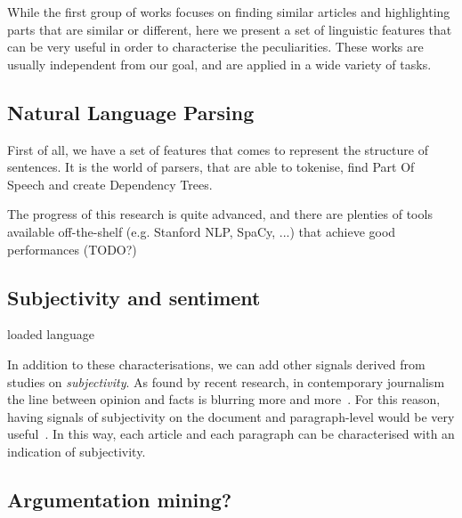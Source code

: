 While the first group of works focuses on finding similar articles and highlighting parts that are similar or different, here we present a set of linguistic features that can be very useful in order to characterise the peculiarities. These works are usually independent from our goal, and are applied in a wide variety of tasks.

\subsection{Natural Language Parsing}

First of all, we have a set of features that comes to represent the structure of sentences. It is the world of parsers, that are able to tokenise, find Part Of Speech and create Dependency Trees.

The progress of this research is quite advanced, and there are plenties of tools available off-the-shelf (e.g. Stanford NLP, SpaCy, ...) that achieve good performances (TODO?)



\subsection{Subjectivity and sentiment}

loaded language

In addition to these characterisations, we can add other signals derived from studies on \emph{subjectivity}.
As found by recent research, in contemporary journalism the line between opinion and facts is blurring more and more~\cite{blake2019news}. For this reason, having signals of subjectivity on the document and paragraph-level would be very useful~\cite{liu2010sentiment}.
In this way, each article and each paragraph can be characterised with an indication of subjectivity.

\subsection{Argumentation mining?}

